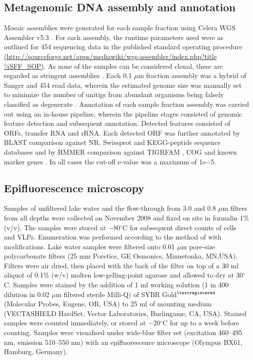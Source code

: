 \subsection{Metagenomic DNA assembly and annotation}
Mosaic assemblies were generated for each sample fraction using Celera \ac{WGS} Assembler v5.3 \cite{Myers2000}. 
For each assembly, the runtime parameters used were as outlined for 454 sequencing data in the published standard operating procedure\\ 
\url{(http://sourceforge.net/apps/mediawiki/wgs-assembler/index.php?title 1⁄4SFF\_SOP)}. 
As none of the samples can be considered clonal, these are regarded as stringent assemblies \cite{Rusch2007}. 
Each 0.1 $\mu$m fraction assembly was a hybrid of Sanger and 454 read data, wherein the estimated genome size was manually set to minimize the number of unitigs from abundant organisms being falsely classified as degenerate \cite{Rusch2007}. 
Annotation of each sample fraction assembly was carried out using an in-house pipeline, wherein the pipeline stages consisted of genomic feature detection and subsequent annotation. 
Detected features consisted of \acp{ORF}, transfer \acs{RNA} and \ac{rRNA}. 
Each detected \ac{ORF} was further annotated by \ac{BLAST} comparison against \ac{NR}, Swissprot and \ac{KEGG}-peptide sequence databases and by \ac{HMMER} comparison against \ac{TIGRFAM} \cite{Haft2001}, \ac{COG} \cite{Tatusov1997, Tatusov2003} and known marker genes \cite{von Mering2007}.
In all cases the cut-off e-value was a maximum of 1e$-$5. 


\subsection{Epifluorescence microscopy}
Samples of unfiltered lake water and the flow-through from 3.0 and 0.8 $\mu$m filters from all depths were collected on November 2008 and fixed on site in formalin 1\% (v/v). 
The samples were stored at $-$80$^{\circ}$C for subsequent direct counts of cells and \acp{VLP}. 
Enumeration was performed according to the method of \citet{Patel2007} with modifications. 
Lake water samples were filtered onto 0.01 $\mu$m pore-size polycarbonate filters (25 mm Poretics, GE Osmonics, Minnetonka, MN,USA). 
Filters were air dried, then placed with the back of the filter on top of a 30 ml aliquot of 0.1\% (w/v) molten low-gelling-point agarose and allowed to dry at 30$^{\circ}$C. 
Samples were stained by the addition of 1 ml working solution (1 in 400 dilution in 0.02 $\mu$m filtered sterile Milli-Q) of SYBR Gold$^{\textregistered}$ (Molecular Probes, Eugene, OR, USA) to 25 ml of mounting medium (VECTASHIELD HardSet, Vector Laboratories, Burlingame, CA, USA). 
Stained samples were counted immediately, or stored at $-$20$^{\circ}$C for up to a week before counting. 
Samples were visualised under wide-blue filter set (excitation 460--495 nm, emission 510--550 nm) with an epifluorescence microscope (Olympus BX61, Hamburg, Germany).


